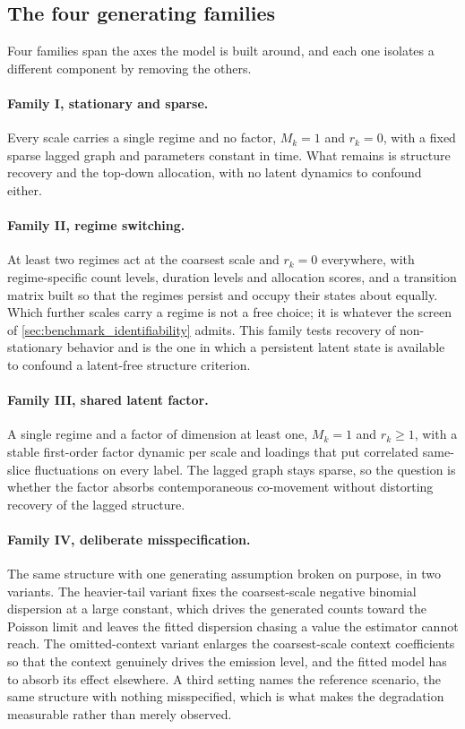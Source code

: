 \subsection{The four generating families}
\label{sec:benchmark_families}

Four families span the axes the model is built around, and each one isolates a
different component by removing the others.

\paragraph{Family I, stationary and sparse.}
Every scale carries a single regime and no factor, \(M_k = 1\) and \(r_k = 0\),
with a fixed sparse lagged graph and parameters constant in time. What remains
is structure recovery and the top-down allocation, with no latent dynamics to
confound either.

\paragraph{Family II, regime switching.}
At least two regimes act at the coarsest scale and \(r_k = 0\) everywhere, with
regime-specific count levels, duration levels and allocation scores, and a
transition matrix built so that the regimes persist and occupy their states
about equally. Which further scales carry a regime is not a free choice; it is
whatever the screen of \cref{sec:benchmark_identifiability} admits. This family
tests recovery of non-stationary behavior and is the one in which a persistent
latent state is available to confound a latent-free structure criterion.

\paragraph{Family III, shared latent factor.}
A single regime and a factor of dimension at least one, \(M_k = 1\) and
\(r_k \ge 1\), with a stable first-order factor dynamic per scale and loadings
that put correlated same-slice fluctuations on every label. The lagged graph
stays sparse, so the question is whether the factor absorbs contemporaneous
co-movement without distorting recovery of the lagged structure.

\paragraph{Family IV, deliberate misspecification.}
The same structure with one generating assumption broken on purpose, in two
variants. The heavier-tail variant fixes the coarsest-scale negative binomial
dispersion at a large constant, which drives the generated counts toward the
Poisson limit and leaves the fitted dispersion chasing a value the estimator
cannot reach. The omitted-context variant enlarges the coarsest-scale context
coefficients so that the context genuinely drives the emission level, and the
fitted model has to absorb its effect elsewhere. A third setting names the
reference scenario, the same structure with nothing misspecified, which is what
makes the degradation measurable rather than merely observed.

